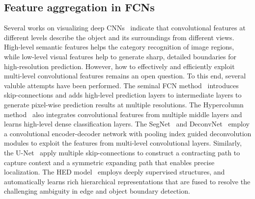 \documentclass[10pt,twocolumn,letterpaper]{article}
\begin{document}
\subsection{Feature aggregation in FCNs}
Several works on visualizing deep CNNs~\cite{simonyan2013deep,zeiler2014visualizing,mahendran2015understanding,Wang2015Visual}  indicate that convolutional features at different levels describe the object and its surroundings from different views.
%
High-level semantic features helps the category recognition of image regions, while low-level visual features help to generate sharp, detailed boundaries for high-resolution prediction.
However, how to effectively and efficiently exploit multi-level convolutional features remains an open question. To this end, several valuble attempts have been performed.
%
The seminal FCN method~\cite{long2015fully} introduces skip-connections and adds high-level prediction layers to intermediate layers to generate pixel-wise prediction results at multiple resolutions.
%
The Hypercolumn method~\cite{hariharan2015hypercolumns} also integrates convolutional features from multiple middle layers and learns high-level dense classification layers.
%
The SegNet~\cite{segnet} and DeconvNet~\cite{noh2015learning} employ a convolutional encoder-decoder network with pooling index guided deconvolution modules to exploit the features from multi-level convolutional layers.
%
Similarly,~ the U-Net~\cite{ronneberger2015u} apply multiple skip-connections to construct a contracting path to capture context and a symmetric expanding path that enables precise localization.
%
The HED model~\cite{xie2015holistically} employs deeply supervised structures, and automatically learns rich hierarchical representations that are fused to resolve the challenging ambiguity in edge and object boundary detection.
\end{document}

